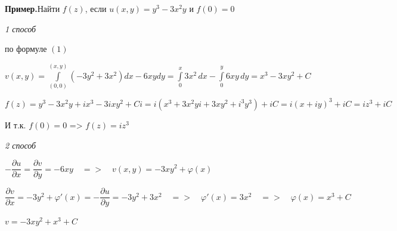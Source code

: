 \documentclass[a4paper, 12pt]{report}
\begin{document}
\textbf{Пример.}\quad Найти $f(z)$, если $u(x, y) = y^3 - 3x^2y$ и $f(0) = 0$
\par\bigskip
\textit{1 способ}
\par
по формуле $(1)$
\begin{center}
    $v(x, y) = \int\limits_{(0, 0)}^{(x, y)} (-3y^2 + 3x^2)dx - 6xydy = \int\limits_0^x 3x^2\,dx - \int\limits_0^y 6xy\,dy = x^3 - 3xy^2 + C $
\end{center}
\begin{center}
    $f(z) = y^3 - 3x^2y + ix^3 - 3ixy^2 + Ci = i(x^3 + 3x^2yi + 3xy^2 + i^3y^3) + iC = i(x + iy)^3 + iC = iz^3 + iC$
    
\end{center}
\par
И т.к. $f(0) = 0$ \quad => \quad $f(z) = iz^3$
\par\bigskip
\textit{2 способ}
\par\bigskip
\begin{center}
    $-\dfrac{\partial u}{\partial x} = \dfrac{\partial v}{\partial y} = -6x y \quad => \quad v(x, y) = -3x y^2 + \varphi(x)$
\end{center}
\par\bigskip
\begin{center}
    $\dfrac{\partial v}{\partial x} = -3y^2 + \varphi'(x) = -\dfrac{\partial u}{\partial y} = -3y^2 + 3x^2 \quad => \quad \varphi'(x) = 3x^2 \quad => \quad \varphi(x) = x^3 + C$
    \par\bigskip
    $v = -3xy^2 + x^3 + C$
\end{center}


\newpage
\end{document}
